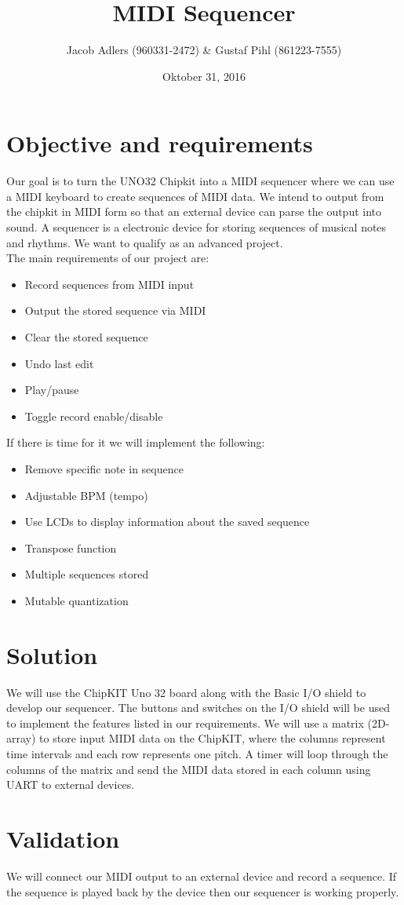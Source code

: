 \documentclass[a4paper,10pt]{article}
\title{MIDI Sequencer}
\author{Jacob Adlers (960331-2472) & Gustaf Pihl (861223-7555)}
\date{Oktober 31, 2016}
\begin{document}
\maketitle

\section{Objective and requirements}
Our goal is to turn the UNO32 Chipkit into a MIDI sequencer where we can use a MIDI keyboard to create sequences of MIDI data. We intend to output from the chipkit in MIDI form so that an external device can parse the output into sound. A sequencer is a electronic device for storing sequences of musical notes and rhythms. We want to qualify as an advanced project.\\

The main requirements of our project are:
\begin{itemize}
  \item Record sequences from MIDI input
  \item Output the stored sequence via MIDI
  \item Clear the stored sequence
  \item Undo last edit
  \item Play/pause
  \item Toggle record enable/disable
\end{itemize}

If there is time for it we will implement the following:
\begin{itemize}
  \item Remove specific note in sequence
  \item Adjustable BPM (tempo)
  \item Use LCDs to display information about the saved sequence
  \item Transpose function
  \item Multiple sequences stored
  \item Mutable quantization
\end{itemize}

\section{Solution}
We will use the ChipKIT Uno 32 board along with the Basic I/O shield to develop our sequencer. The buttons and switches on the I/O shield will be used to implement the features listed in our requirements. We will use a matrix (2D-array) to store input MIDI data on the ChipKIT, where the columns represent time intervals and each row represents one pitch. A timer will loop through the columns of the matrix and send the MIDI data stored in each column using UART to external devices.

\section{Validation}
We will connect our MIDI output to an external device and record a sequence. If the sequence is played back by the device then our sequencer is working properly.
\end{document}
